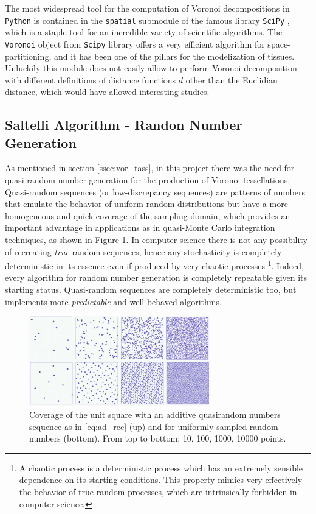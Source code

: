 The most widespread tool for the computation of Voronoi decompositions in \texttt{Python} is contained in the \texttt{spatial} submodule of the famous library \texttt{SciPy} \cite{2020SciPy-NMeth}, which is a staple tool for an incredible variety of scientific algorithms. The \texttt{Voronoi} object from \texttt{Scipy} library offers a very efficient algorithm for space-partitioning, and it has been one of the pillars for the modelization of tissues. Unluckily this module does not easily allow to perform Voronoi decomposition with different definitions of distance functions $d$ other than the Euclidian distance, which would have allowed interesting studies.

\subsection{Saltelli Algorithm - Randon Number Generation} \label{ssec:saltelli}

As mentioned in section \ref{ssec:vor_tass}, in this project there was the need for quasi-random number generation for the production of Voronoi tessellations. Quasi-random sequences (or low-discrepancy sequences) are patterns of numbers that emulate the behavior of uniform random distributions but have a more homogeneous and quick coverage of the sampling domain, which provides an important advantage in applications as in quasi-Monte Carlo integration techniques, as shown in Figure \ref{fig:Subrandom_2D}. In computer science there is not any possibility of recreating \textit{true} random sequences, hence any stochasticity is completely deterministic in its essence even if produced by very chaotic processes \footnote{A chaotic process is a deterministic process which has an extremely sensible dependence on its starting conditions. This property mimics very effectively the behavior of true random processes, which are intrinsically forbidden in computer science.}. Indeed, every algorithm for random number generation is completely repeatable given its starting status. Quasi-random sequences are completely deterministic too, but implements more \textit{predictable} and well-behaved algorithms.

\begin{figure}
    \centering
    \includegraphics[width = 0.7\textwidth]{images/Subrandom_2D}
    \caption{Coverage of the unit square with an additive quasirandom numbers sequence as in \ref{eq:ad_rec} (up) and for uniformly sampled random numbers (bottom). From top to bottom: 10, 100, 1000, 10000 points.}
    \label{fig:Subrandom_2D}
\end{figure}

